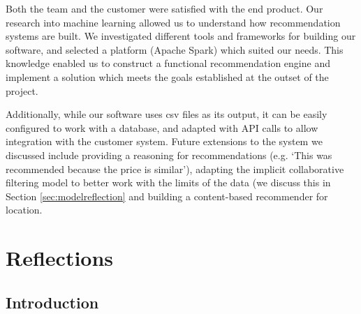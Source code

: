 \documentclass{l3proj}
\begin{document}
Both the team and the customer were satisfied with the end product. Our research into machine learning allowed us to understand how recommendation systems are built. We investigated different tools and frameworks for building our software, and selected a platform (Apache Spark) which suited our needs. This knowledge enabled us to construct a functional recommendation engine and implement a solution which meets the goals established at the outset of the project. 

Additionally, while our software uses csv files as its output, it can be easily configured to work with a database, and adapted with API calls to allow integration with the customer system. Future extensions to the system we discussed include providing a reasoning for recommendations (e.g. `This was recommended because the price is similar'), adapting the implicit collaborative filtering model to better work with the limits of the data (we discuss this in Section \ref{sec:modelreflection} and building a content-based recommender for location.

\newpage

\section{Reflections}
\label{sec:reflections}



\subsection{Introduction}
\label{sec:leadreflection}
\end{document}
